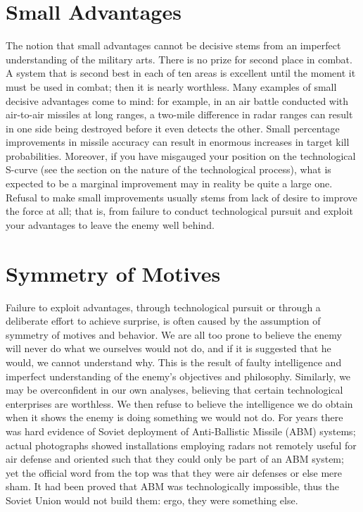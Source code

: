 \section{Small Advantages}
The notion that small advantages cannot be decisive stems from an imperfect understanding of the military arts. There is no prize for second place in combat. A system that is second best in each of ten areas is excellent until the moment it must be used in combat; then it is nearly worthless. Many examples of small decisive advantages come to mind: for example, in an air battle conducted with air-to-air missiles at long ranges, a two-mile difference in radar ranges can result in one side being destroyed before it even detects the other. Small percentage improvements in missile accuracy can result in enormous increases in target kill probabilities. Moreover, if you have misgauged your position on the technological S-curve (see the section on the nature of the technological process), what is expected to be a marginal improvement may in reality be quite a large one. Refusal to make small improvements usually stems from lack of desire to improve the force at all; that is, from failure to conduct technological pursuit and exploit your advantages to leave the enemy well behind.

\section{Symmetry of Motives}
Failure to exploit advantages, through technological pursuit or through a deliberate effort to achieve surprise, is often caused by the assumption of symmetry of motives and behavior. We are all too prone to believe the enemy will never do what we ourselves would not do, and if it is suggested that he would, we cannot understand why. This is the result of faulty intelligence and imperfect understanding of the enemy's objectives and philosophy. Similarly, we may be overconfident in our own analyses, believing that certain technological enterprises are worthless. We then refuse to believe the intelligence we do obtain when it shows the enemy is doing something we would not do. For years there was hard evidence of Soviet deployment of Anti-Ballistic Missile (ABM) systems; actual photographs showed installations employing radars not remotely useful for air defense and oriented such that they could only be part of an ABM system; yet the official word from the top was that they were air defenses or else mere sham. It had been proved that ABM was technologically impossible, thus the Soviet Union would not build them: ergo, they were something else.

